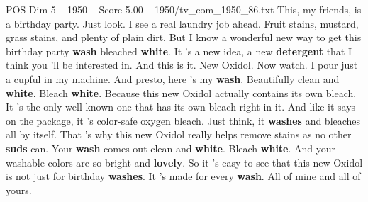 \begin{textsample}{POS Dim 5 – 1950 – Score 5.00 – 1950/tv\_com\_1950\_86.txt}  \label{ex:f5_pos_044}
This, my friends, is a birthday party.
Just look.
I see a real laundry job ahead.
Fruit stains, mustard, grass stains, and plenty of plain dirt.
But I know a wonderful new way to get this birthday party \textbf{wash} bleached \textbf{white}.
It 's a new idea, a new \textbf{detergent} that I think you 'll be interested in.
And this is it.
New Oxidol.
Now watch.
I pour just a cupful in my machine.
And presto, here 's my \textbf{wash}.
Beautifully clean and \textbf{white}.
Bleach \textbf{white}.
Because this new Oxidol actually contains its own bleach.
It 's the only well-known one that has its own bleach right in it.
And like it says on the package, it 's color-safe oxygen bleach.
Just think, it \textbf{washes} and bleaches all by itself.
That 's why this new Oxidol really helps remove stains as no other \textbf{suds} can.
Your \textbf{wash} comes out clean and \textbf{white}.
Bleach \textbf{white}.
And your washable colors are so bright and \textbf{lovely}.
So it 's easy to see that this new Oxidol is not just for birthday \textbf{washes}.
It 's made for every \textbf{wash}.
All of mine and all of yours.

\end{textsample}
